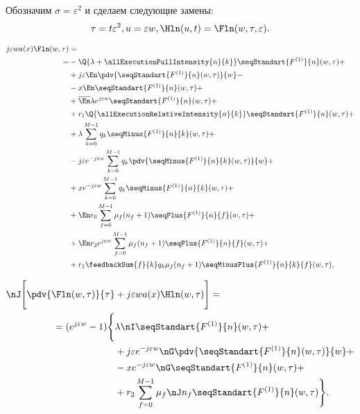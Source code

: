Обозначим \(\sigma = \varepsilon^2\) и сделаем следующие замены:
\begin{equation}
    \tau = t\varepsilon^2, u = \varepsilon w, 
    \Hln (u, t) = \Fln (w, \tau, \varepsilon).
\end{equation}

\begin{equation}\begin{aligned}\label{F1FirstEquationParticular}
j\varepsilon wa(x) \Fln (w,\tau)&=  \\
   =&-\Q{\lambda+\allExecutionFullIntensity{n}{k}}\seqStandart{F^{(1)}}{n}(w,\tau)+\\
    &+j \varepsilon \En \pdv{\seqStandart{F^{(1)}}{n}(w,\tau)}{w} - \\
    &-x \En \seqStandart{F^{(1)}}{n}(w,\tau) + \\
    &+\overline{\En} \lambda e^{j\varepsilon w} \seqStandart{F^{(1)}}{n}(w,\tau)+\\
    &+r_1 \Q{\allExecutionRelativeIntensity{n}{k}} \seqStandart{F^{(1)}}{n}(w,\tau) + \\
    &+\lambda\sum_{k=0}^{M-1}q_k \seqMinus{F^{(1)}}{n}{k}(w,\tau) + \\
    &-j \varepsilon  e^{-j\varepsilon w} \sum_{k=0}^{M-1}q_k \pdv{\seqMinus{F^{(1)}}{n}{k}(w,\tau)}{w} + \\
    &+x  e^{-j\varepsilon w} \sum_{k=0}^{M-1}q_k \seqMinus{F^{(1)}}{n}{k}(w,\tau) + \\
    &+\En r_0 \sum_{f=0}^{M-1} \mu_f (n_f + 1) \seqPlus{F^{(1)}}{n}{f}(w,\tau) + \\
    &+\En r_2 e^{j\varepsilon w} \sum_{f=0}^{M-1} \mu_f (n_f + 1) \seqPlus{F^{(1)}}{n}{f}(w,\tau) + \\
    &+r_1 \feedbackSum{f}{k}
        q_k \mu_f (n_f+1) \seqMinusPlus{F^{(1)}}{n}{k}{f}(w,\tau),
\end{aligned}\end{equation}

\begin{equation}\begin{aligned}\label{F1SecondEquationParticular}
\nJ \Bigg[ \pdv{\Fln(w,\tau)}{\tau} & + j\varepsilon wa(x) \Hln (w,\tau) \Bigg] = \\
=(e^{j\varepsilon w} - 1)
\Bigg\{
    &\lambda \nI \seqStandart{F^{(1)}}{n}(w,\tau)+\\
    &+j\varepsilon e^{-j\varepsilon w} \nG\pdv{\seqStandart{F^{(1)}}{n}(w,\tau)}{w} + \\
    &-x e^{-j\varepsilon w} \nG \seqStandart{F^{(1)}}{n}(w,\tau) + \\
    &+r_2\sum_{f=0}^{M-1} \mu_f \nJ n_f \seqStandart{F^{(1)}}{n}(w,\tau)
\Bigg\}
.
\end{aligned}\end{equation}


